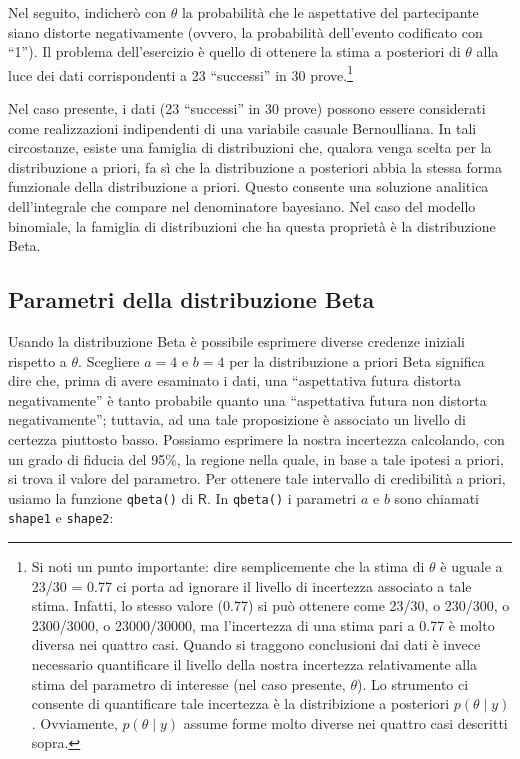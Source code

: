 \documentclass[
]{memoir}
\newcommand{\R}{\textsf{R}} %
\theoremstyle{definition}
\theoremstyle{definition}
\theoremstyle{definition}
\theoremstyle{definition}
\theoremstyle{remark}
\begin{document}
Nel seguito, indicherò con \(\theta\) la probabilità che le aspettative del partecipante siano distorte negativamente (ovvero, la probabilità dell'evento codificato con ``1''). Il problema dell'esercizio è quello di ottenere la stima a posteriori di \(\theta\) alla luce dei dati corrispondenti a 23 ``successi'' in 30 prove.\footnote{Si noti un punto importante: dire semplicemente che la stima di \(\theta\) è uguale a 23/30 = 0.77 ci porta ad ignorare il livello di incertezza associato a tale stima. Infatti, lo stesso valore (0.77) si può ottenere come 23/30, o 230/300, o 2300/3000, o 23000/30000, ma l'incertezza di una stima pari a 0.77 è molto diversa nei quattro casi. Quando si traggono conclusioni dai dati è invece necessario quantificare il livello della nostra incertezza relativamente alla stima del parametro di interesse (nel caso presente, \(\theta\)). Lo strumento ci consente di quantificare tale incertezza è la distribizione a posteriori \(p(\theta \mid y)\). Ovviamente, \(p(\theta \mid y)\) assume forme molto diverse nei quattro casi descritti sopra.}

Nel caso presente, i dati (23 ``successi'' in 30 prove) possono essere considerati come realizzazioni indipendenti di una variabile casuale Bernoulliana. In tali circostanze, esiste una famiglia di distribuzioni che, qualora venga scelta per la distribuzione a priori, fa sì che la distribuzione a posteriori abbia la stessa forma funzionale della distribuzione a priori. Questo consente una soluzione analitica dell'integrale che compare nel denominatore bayesiano. Nel caso del modello binomiale, la famiglia di distribuzioni che ha questa proprietà è la distribuzione Beta.

\hypertarget{parametri-della-distribuzione-beta}{%
\subsection{Parametri della distribuzione Beta}\label{parametri-della-distribuzione-beta}}

Usando la distribuzione Beta è possibile esprimere diverse credenze iniziali rispetto a \(\theta\). Scegliere \(a=4\) e \(b=4\) per la distribuzione a priori Beta significa dire che, prima di avere esaminato i dati, una ``aspettativa futura distorta negativamente'' è tanto probabile quanto una ``aspettativa futura non distorta negativamente''; tuttavia, ad una tale proposizione è associato un livello di certezza piuttosto basso. Possiamo esprimere la nostra incertezza calcolando, con un grado di fiducia del 95\%, la regione nella quale, in base a tale ipotesi a priori, si trova il valore del parametro. Per ottenere tale intervallo di credibilità a priori, usiamo la funzione \texttt{qbeta()} di \(\R\). In \texttt{qbeta()} i parametri \(a\) e \(b\) sono chiamati \texttt{shape1} e \texttt{shape2}:
\end{document}
